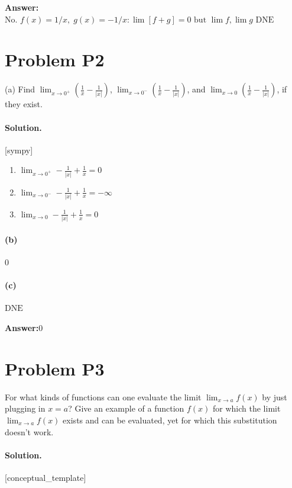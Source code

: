 \documentclass[11pt,a4paper]{article}
\newcommand{\solvertag}[1]{{\footnotesize\color{gray}\textsf{[#1]}}}
\begin{document}
\noindent\textbf{Answer:}\quad $\text{No. } f(x)=1/x,\; g(x)=-1/x: \lim[f+g]=0 \text{ but } \lim f, \lim g \text{ DNE}$

\medskip

\section*{Problem P2}
(a) Find $\lim_{x \to 0^+}(\frac{1}{x} - \frac{1}{|x|})$, $\lim_{x \to 0^-}(\frac{1}{x} - \frac{1}{|x|})$, and $\lim_{x \to 0}(\frac{1}{x} - \frac{1}{|x|})$, if they exist.

\paragraph{Solution.} \solvertag{sympy} 

\begin{enumerate}[leftmargin=*]
  \item $\lim_{x \to 0^+} - \frac{1}{\left|{x}\right|} + \frac{1}{x} = 0$
  \item $\lim_{x \to 0^-} - \frac{1}{\left|{x}\right|} + \frac{1}{x} = -\infty$
  \item $\lim_{x \to 0} - \frac{1}{\left|{x}\right|} + \frac{1}{x} = 0$
\end{enumerate}

\paragraph{(b)} $0$

\paragraph{(c)} $\text{DNE}$

\noindent\textbf{Answer:}\quad $0$

\medskip

\section*{Problem P3}
For what kinds of functions can one evaluate the limit $\lim_{x \to a} f(x)$ by just plugging in $x = a$? Give an example of a function $f(x)$ for which the limit $\lim_{x \to a} f(x)$ exists and can be evaluated, yet for which this substitution doesn't work.

\paragraph{Solution.} \solvertag{conceptual\_template} 
\end{document}
